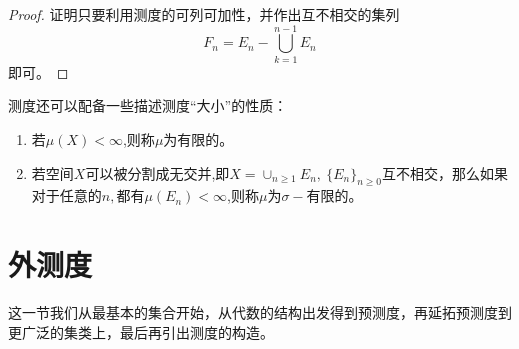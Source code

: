 \documentclass[lang=cn,10pt]{elegantbook}
\begin{document}
	\begin{proof}
		证明只要利用测度的可列可加性，并作出互不相交的集列
		\[F_n=E_n-\bigcup_{k=1}^{n-1}E_n\]
		即可。
	\end{proof}
	测度还可以配备一些描述测度“大小”的性质：
	\begin{enumerate}
		\item 若\(\mu(X)<\infty\),则称\(\mu\)为有限的。
		\item 若空间\(X\)可以被分割成无交并,即\(X=\cup_{n\ge1}E_n,\ \{E_n\}_{n\ge 0}\)互不相交，那么如果对于任意的\(n,\)都有\(\mu(E_n)<\infty\),则称\(\mu\)为\(\sigma-\)有限的。
	\end{enumerate}

	\section{外测度}
	这一节我们从最基本的集合开始，从代数的结构出发得到预测度，再延拓预测度到更广泛的集类上，最后再引出测度的构造。
\end{document}
